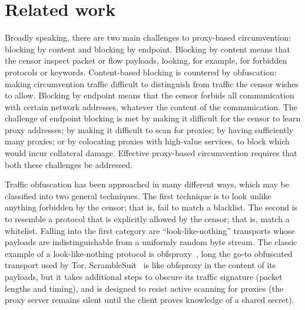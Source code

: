 \documentclass{article}
\begin{document}

\section{Related work}


Broadly speaking, there are two main challenges to proxy-based circumvention:
blocking by content and blocking by endpoint.
Blocking by content means that the censor inspect packet or flow payloads,
looking, for example, for forbidden protocols or keywords.
Content-based blocking is countered by obfuscation:
making circumvention traffic difficult to distinguish
from traffic the censor wishes to allow.
Blocking by endpoint means that the censor forbids all communication with certain
network addresses, whatever the content of the communication.
The challenge of endpoint blocking is met by making it difficult for the censor to learn proxy addresses;
by making it difficult to scan for proxies;
by having sufficiently many proxies;
or by colocating proxies with high-value services, to block which would incur collateral damage.
Effective proxy-based circumvention requires that both these challenges be addressed.

Traffic obfuscation has been approached in many different ways,
which may be classified into two general techniques.
The first technique is to look unlike
anything forbidden by the censor; that is, fail to match a blacklist. The second is
to resemble a protocol that is explicitly allowed by the censor; that is, match a whitelist.
Falling into the first category are ``look-like-nothing'' transports whose
payloads are indistinguishable from a uniformly random byte stream.
The classic example of a look-like-nothing
protocol is obfsproxy~\cite{obfsproxy}, long the go-to obfuscated
transport used by Tor. ScrambleSuit~\cite{scramblesuit} is like obfsproxy in the
content of its payloads, but it takes additional steps to obscure its traffic signature
(packet lengths and timing), and is designed to resist active scanning for proxies
(the proxy server remains silent until the client proves knowledge of a shared
secret).
\end{document}
